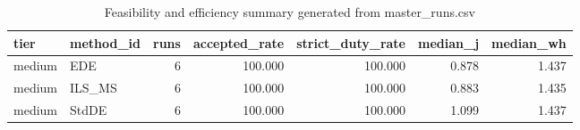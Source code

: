 \begin{table}[!t]
\centering
\caption{Feasibility and efficiency summary generated from master_runs.csv}
\label{tab:feasibility_summary_generated}
\begin{tabular}{llrrrrr}
\toprule
tier & method_id & runs & accepted_rate & strict_duty_rate & median_j & median_wh \\
\midrule
medium & EDE & 6 & 100.000 & 100.000 & 0.878 & 1.437 \\
medium & ILS_MS & 6 & 100.000 & 100.000 & 0.883 & 1.435 \\
medium & StdDE & 6 & 100.000 & 100.000 & 1.099 & 1.437 \\
\bottomrule
\end{tabular}

\end{table}